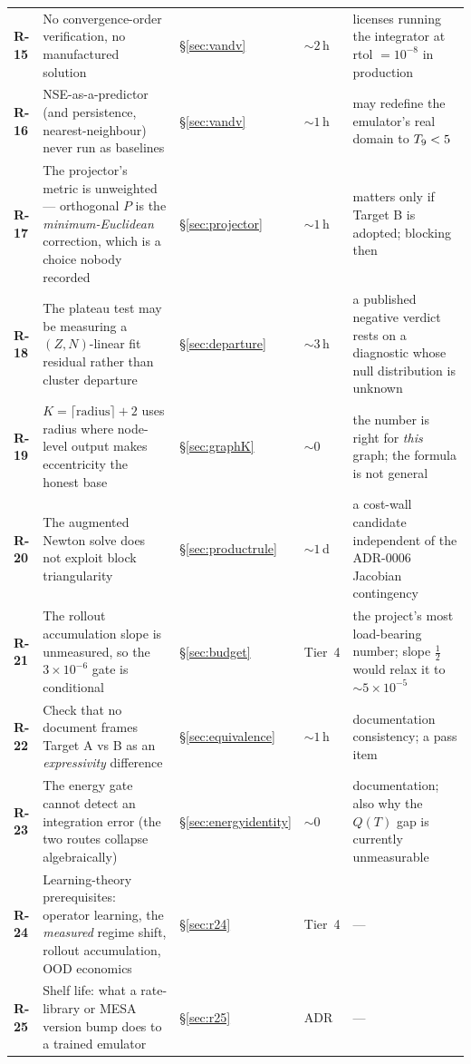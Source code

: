 \begin{longtable}{@{}L{1.15cm} L{5.85cm} L{1.9cm} L{1.6cm} L{4.0cm}@{}}
\textbf{R-15} &
No convergence-order verification, no manufactured solution & \S\ref{sec:vandv}
& ${\sim}2$\,h &
licenses running the integrator at rtol $= 10^{-8}$ in production \\

\textbf{R-16} &
NSE-as-a-predictor (and persistence, nearest-neighbour) never run as baselines &
\S\ref{sec:vandv} & ${\sim}1$\,h &
may redefine the emulator's real domain to $T_{9} < 5$ \\

\textbf{R-17} &
The projector's metric is unweighted --- orthogonal $P$ is the
\emph{minimum-Euclidean} correction, which is a choice nobody recorded &
\S\ref{sec:projector} & ${\sim}1$\,h &
matters only if Target B is adopted; blocking then \\

\textbf{R-18} &
The \rQSE{} plateau test may be measuring a $(Z, N)$-linear fit residual rather
than cluster departure & \S\ref{sec:departure} & ${\sim}3$\,h &
a published negative verdict rests on a diagnostic whose null distribution is
unknown \\

\textbf{R-19} &
$K = \lceil\text{radius}\rceil + 2$ uses radius where node-level output makes
eccentricity the honest base & \S\ref{sec:graphK} & ${\sim}0$ &
the number is right for \emph{this} graph; the formula is not general \\

\textbf{R-20} &
The augmented Newton solve does not exploit block triangularity &
\S\ref{sec:productrule} & ${\sim}1$\,d &
a cost-wall candidate independent of the ADR-0006 Jacobian contingency \\

\textbf{R-21} &
The rollout accumulation slope is unmeasured, so the $3\times10^{-6}$ gate is
conditional & \S\ref{sec:budget} & Tier~4 &
the project's most load-bearing number; slope $\tfrac12$ would relax it to
${\sim}5\times10^{-5}$ \\

\textbf{R-22} &
Check that no document frames Target A vs B as an \emph{expressivity}
difference & \S\ref{sec:equivalence} & ${\sim}1$\,h &
documentation consistency; a  pass item \\

\textbf{R-23} &
The energy gate cannot detect an integration error (the two routes collapse
algebraically) & \S\ref{sec:energyidentity} & ${\sim}0$ &
documentation; also why the $Q(T)$ gap is currently unmeasurable \\

\textbf{R-24} &
Learning-theory prerequisites: operator learning, the \emph{measured} regime
shift, rollout accumulation, OOD economics & \S\ref{sec:r24} & Tier~4 & --- \\

\textbf{R-25} &
Shelf life: what a rate-library or MESA version bump does to a trained
emulator & \S\ref{sec:r25} & ADR & --- \\
\end{longtable}
\endgroup

